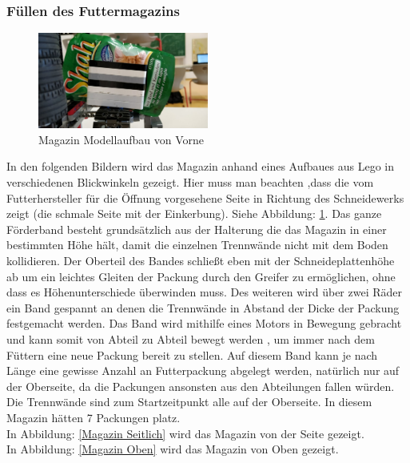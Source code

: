 \subsubsection{Füllen des Futtermagazins}


\begin{figure}
\vspace{-30pt}
  \begin{center}
    \includegraphics[width=0.50\textwidth]{Bilder/Ablauf_1_png/Magazin_Vorne}
  \end{center}
  \caption{Magazin Modellaufbau von Vorne}
  \label{Magazin Vorne}
  \vspace{-10pt}
\end{figure}

In den folgenden Bildern wird das Magazin anhand eines Aufbaues aus Lego in verschiedenen Blickwinkeln gezeigt. Hier muss man beachten ,dass die vom Futterhersteller für die Öffnung vorgesehene Seite in Richtung des Schneidewerks zeigt (die schmale Seite mit der Einkerbung). Siehe Abbildung: \ref{Magazin Vorne}.
Das ganze Förderband besteht grundsätzlich aus der Halterung die das Magazin in einer bestimmten Höhe hält, damit die einzelnen Trennwände nicht mit dem Boden kollidieren. Der Oberteil des Bandes schließt eben mit der Schneideplattenhöhe ab um ein leichtes Gleiten der Packung durch den Greifer zu ermöglichen, ohne dass es Höhenunterschiede überwinden muss. Des weiteren wird über zwei Räder ein Band gespannt an denen die Trennwände in Abstand der Dicke der Packung festgemacht werden. Das Band wird mithilfe eines Motors in Bewegung gebracht und kann somit von Abteil zu Abteil bewegt werden , um immer nach dem Füttern eine neue Packung bereit zu stellen. Auf diesem Band kann je nach Länge eine gewisse Anzahl an Futterpackung abgelegt werden, natürlich nur auf der Oberseite, da die Packungen ansonsten aus den Abteilungen fallen würden. Die Trennwände sind zum Startzeitpunkt alle auf der Oberseite. In diesem Magazin hätten 7 Packungen platz.\\

In Abbildung: \ref{Magazin Seitlich} wird das Magazin von der Seite gezeigt. \\
In Abbildung: \ref{Magazin Oben} wird das Magazin von Oben gezeigt. 

